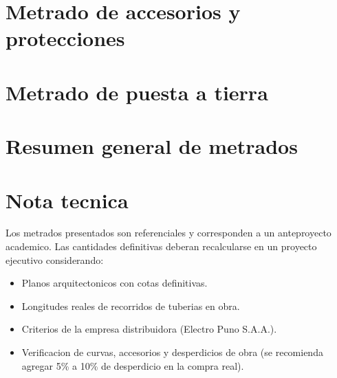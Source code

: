 

\section{Metrado de accesorios y protecciones}



\section{Metrado de puesta a tierra}



\section{Resumen general de metrados}



\section{Nota tecnica}

Los metrados presentados son referenciales y corresponden a un anteproyecto academico. Las cantidades definitivas deberan recalcularse en un proyecto ejecutivo considerando:

\begin{itemize}
  \item Planos arquitectonicos con cotas definitivas.
  \item Longitudes reales de recorridos de tuberias en obra.
  \item Criterios de la empresa distribuidora (Electro Puno S.A.A.).
  \item Verificacion de curvas, accesorios y desperdicios de obra (se recomienda agregar 5\% a 10\% de desperdicio en la compra real).
\end{itemize}
